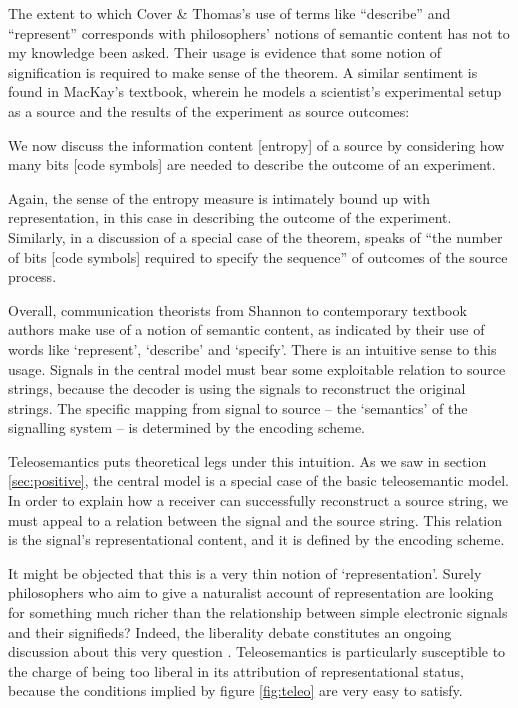\documentclass[12pt]{article}
\begin{document}
\noindent The extent to which Cover \& Thomas's use of terms like ``describe'' and ``represent'' corresponds with philosophers' notions of semantic content has not to my knowledge been asked.
Their usage is evidence that some notion of signification is required to make sense of the theorem.
A similar sentiment is found in MacKay's textbook, wherein he models a scientist's experimental setup as a source and the results of the experiment as source outcomes:

\begin{myquote}
We now discuss the information content [entropy] of a source by considering how many bits [code symbols] are needed to describe the outcome of an experiment.
\par\hspace*{\fill}\citet[73]{mackay2003information}
\end{myquote}

\noindent Again, the sense of the entropy measure is intimately bound up with representation, in this case in describing the outcome of the experiment.
Similarly, in a discussion of a special case of the theorem, \citet[397]{shannon1948mathematicalc} speaks of ``the number of bits [code symbols] required to specify the sequence'' of outcomes of the source process.

Overall, communication theorists from Shannon to contemporary textbook authors make use of a notion of semantic content, as indicated by their use of words like `represent', `describe' and `specify'.
There is an intuitive sense to this usage.
Signals in the central model must bear some exploitable relation to source strings, because the decoder is using the signals to reconstruct the original strings.
The specific mapping from signal to source -- the `semantics' of the signalling system -- is determined by the encoding scheme.

Teleosemantics puts theoretical legs under this intuition.
As we saw in section \ref{sec:positive}, the central model is a special case of the basic teleosemantic model.
In order to explain how a receiver can successfully reconstruct a source string, we must appeal to a relation between the signal and the source string.
This relation is the signal's representational content, and it is defined by the encoding scheme.

It might be objected that this is a very thin notion of `representation'.
Surely philosophers who aim to give a naturalist account of representation are looking for something much richer than the relationship between simple electronic signals and their signifieds?
Indeed, the liberality debate constitutes an ongoing discussion about this very question \citep{artiga2016liberal,artiga2022strong,desouzafilho2022dual}.
Teleosemantics is particularly susceptible to the charge of being too liberal in its attribution of representational status, because the conditions implied by figure \ref{fig:teleo} are very easy to satisfy.
\end{document}

